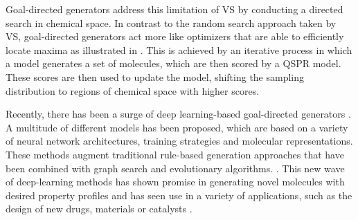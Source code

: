 Goal-directed generators address this limitation of \ac{VS} by conducting a directed search in chemical
space. In contrast to the random search approach taken by \ac{VS},
goal-directed generators act more like optimizers that are able to efficiently locate maxima as
illustrated in . This is achieved by an iterative process in
which a model generates a set of molecules, which are then scored by a \ac{QSPR} model. These scores
are then used to update the model, shifting the sampling distribution to regions of chemical space
with higher scores.

Recently, there has been a surge of deep learning-based goal-directed generators
\citep{eltonDeepLearningMolecular2019,sanchez-lengelingInverseMolecularDesign2018,duMachineLearningaidedGenerative2024}.
A multitude of different models has been proposed, which are based on a variety of neural network
architectures, training strategies and molecular representations. These methods augment traditional
rule-based generation approaches that have been combined with graph search and evolutionary
algorithms. \citep{schneiderComputerbasedNovoDesign2005,schneiderNovoMolecularDesign2013}. This new
wave of deep-learning methods has shown promise in generating novel molecules with desired
property profiles and has seen use in a variety of applications, such as the design of new drugs,
materials or catalysts \citep{zhavoronkovDeepLearningEnables2019,anstineGenerativeModelsEmerging2023,zahrtPredictionHigherselectivityCatalysts2019,daveAutonomousDiscoveryBattery2020,kimDatadrivenElectrolyteDesign2023,moonActiveLearningGuides2024}.

